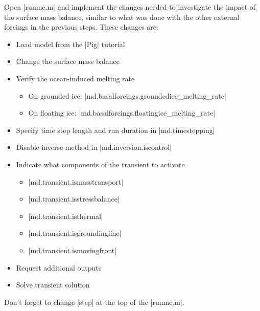 Open \lstinlinebg|runme.m| and implement the changes needed to investigate the impact of the surface mass balance, similar to what was done with the other external forcings in the previous steps. These changes are:
\begin{itemize}
	\item Load model from the \lstinlinebg|Pig| tutorial
	\item Change the surface mass balance
	\item Verify the ocean-induced melting rate
		\begin{itemize}
			\item On grounded ice: \lstinlinebg|md.basalforcings.groundedice_melting_rate|
			\item On floating ice: \lstinlinebg|md.basalforcings.floatingice_melting_rate|
		\end{itemize}
	\item Specify time step length and run duration in \lstinlinebg|md.timestepping|
	\item Disable inverse method in \lstinlinebg|md.inversion.iscontrol|
	\item Indicate what components of the transient to activate
		\begin{itemize}
			\item \lstinlinebg|md.transient.ismasstransport|
			\item \lstinlinebg|md.transient.isstressbalance|
			\item \lstinlinebg|md.transient.isthermal|
			\item \lstinlinebg|md.transient.isgroundingline|
			\item \lstinlinebg|md.transient.ismovingfront|
		\end{itemize}
	\item Request additional outputs
	\item Solve transient solution
\end{itemize}

Don't forget to change \lstinlinebg|step| at the top of the \lstinlinebg|runme.m|.

